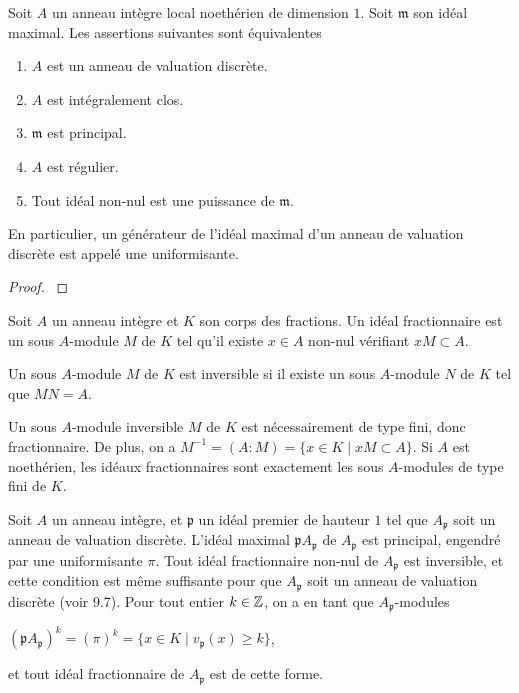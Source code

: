 \begin{prop}\label{DVRCarac}
Soit $A$ un anneau intègre local noethérien de dimension $1$. Soit $\mathfrak{m}$ son idéal maximal. Les assertions suivantes sont équivalentes
\begin{enumerate}
\item $A$ est un anneau de valuation discrète.
\item $A$ est intégralement clos.
\item $\mathfrak{m}$ est principal.
\item $A$ est régulier.
\item Tout idéal non-nul est une puissance de $\mathfrak{m}$.
\end{enumerate}
En particulier, un générateur de l'idéal maximal d'un anneau de valuation discrète est appelé une uniformisante.
\end{prop}
\begin{proof}
\cite[9.2]{atiyahmacdo} 
\end{proof}

\begin{defn}
Soit $A$ un anneau intègre et $K$ son corps des fractions. Un idéal fractionnaire est un sous $A$-module $M$ de $K$ tel qu'il existe $x\in A$ non-nul vérifiant $xM\subset A$.
\end{defn}

\begin{defn}\label{DefIdealInvertible}
Un sous $A$-module $M$ de $K$ est inversible si il existe un sous $A$-module $N$ de $K$ tel que $MN=A$.
\end{defn}

Un sous $A$-module inversible $M$ de $K$ est nécessairement de type fini, donc fractionnaire. De plus, on a $M^{-1}=(A:M)=\lbrace x\in K\mid xM\subset A\rbrace$. Si $A$ est noethérien, les idéaux fractionnaires sont exactement les sous $A$-modules de type fini de $K$. 

Soit $A$ un anneau intègre, et $\mathfrak{p}$ un idéal premier de hauteur $1$ tel que $A_\mathfrak{p}$ soit un anneau de valuation discrète. L'idéal maximal $\mathfrak{p}A_\mathfrak{p}$ de $A_\mathfrak{p}$ est principal, engendré par une uniformisante $\pi$. Tout idéal fractionnaire non-nul de $A_\mathfrak{p}$ est inversible, et cette condition est même suffisante pour que $A_\mathfrak{p}$ soit un anneau de valuation discrète (voir \cite{atiyahmacdo} 9.7). Pour tout entier $k\in \mathbb{Z}$, on a en tant que $A_\mathfrak{p}$-modules
\begin{center}
$(\mathfrak{p}A_\mathfrak{p})^k=(\pi)^k=\lbrace x\in K\mid v_\mathfrak{p}(x)\geq k \rbrace$,
\end{center}
et tout idéal fractionnaire de $A_\mathfrak{p}$ est de cette forme.


